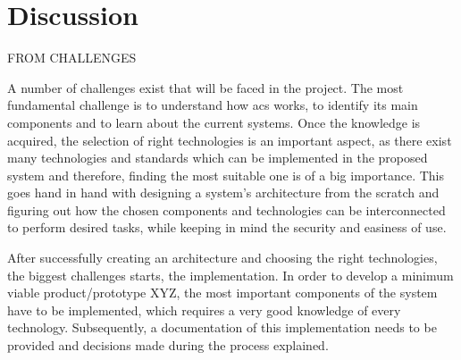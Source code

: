 \section{Discussion}\label{sec:discussion}

FROM CHALLENGES

A number of challenges exist that will be faced in the project. The most fundamental challenge is to understand how \acrshort{acs} works, to identify its main components and to learn about the current systems. Once the knowledge is acquired, the selection of right technologies is an important aspect, as there exist many technologies and standards which can be implemented in the proposed system and therefore, finding the most suitable one is of a big importance. This goes hand in hand with designing a system’s architecture from the scratch and figuring out how the chosen components and technologies can be interconnected to perform desired tasks, while keeping in mind the security and easiness of use.

After successfully creating an architecture and choosing the right technologies, the biggest challenges starts, the implementation. In order to develop a minimum viable product/prototype XYZ, the most important components of the system have to be implemented, which requires a very good knowledge of every technology. Subsequently, a documentation of this implementation needs to be provided and decisions made during the process explained.

